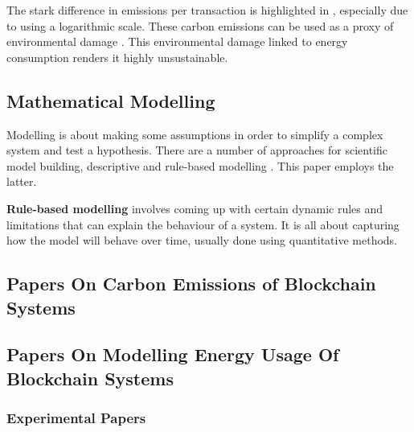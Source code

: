 The stark difference in emissions per transaction is highlighted in , especially due to using a logarithmic scale. These carbon emissions can be used as a proxy of environmental damage \cite{2022VisaReport}. This environmental damage linked to energy consumption renders it highly unsustainable.




\subsection{Mathematical Modelling}

Modelling is about making some assumptions in order to simplify a complex system and test a hypothesis. There are a number of approaches for scientific model building, descriptive and rule-based modelling \cite{SayamaINTRODUCTIONSYSTEMS}. This paper employs the latter.

\textbf{Rule-based modelling} involves coming up with certain dynamic rules and limitations that can explain the behaviour of a system. It is all about capturing how the model will behave over time, usually done using quantitative methods.







\subsection{Papers On Carbon Emissions of Blockchain Systems}



\subsection{Papers On Modelling Energy Usage Of Blockchain Systems}



\subsubsection{Experimental Papers}



